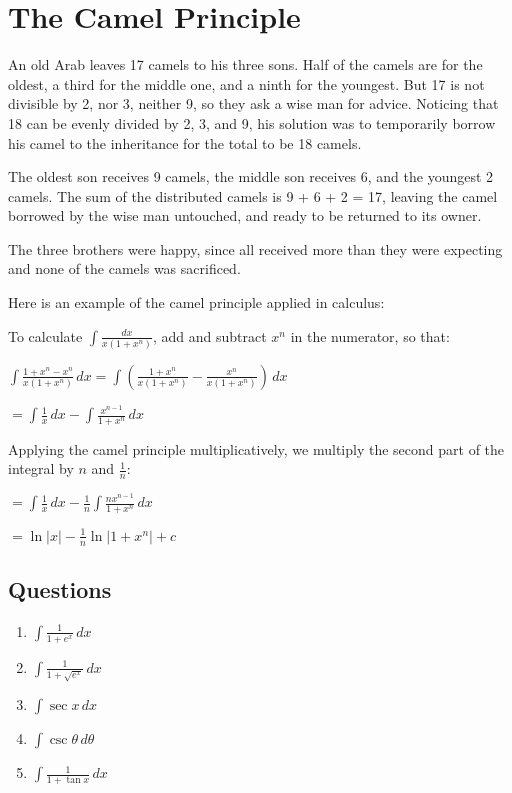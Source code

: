 \documentclass[../main.tex]{subfiles}
\begin{document}
\section{The Camel Principle}
An old Arab leaves 17 camels to his three sons. Half of the camels are for the oldest, a third for the middle one, and a ninth for the youngest. But 17 is not divisible by 2, nor 3, neither 9, so they ask a wise man for advice. Noticing that 18 can be evenly divided by 2, 3, and 9, his solution was to temporarily borrow his camel to the inheritance for the total to be 18 camels.

The oldest son receives 9 camels, the middle son receives 6, and the youngest 2 camels. The sum of the distributed camels is 9 + 6 + 2 = 17, leaving the camel borrowed by the wise man untouched, and ready to be returned to its owner.

The three brothers were happy, since all received more than they were expecting and none of the camels was sacrificed.

Here is an example of the camel principle applied in calculus:

To calculate \(\int \frac{dx}{x(1+x^n)}\), add and subtract \(x^n\) in the numerator, so that:

\(\int \frac{1+x^n-x^n}{x(1+x^n)}\,dx=\int (\frac{1+x^n}{x(1+x^n)}-\frac{x^n}{x(1+x^n)})\,dx\)

\(=\int \frac{1}{x}\,dx-\int \frac{x^{n-1}}{1+x^n}\,dx\)

Applying the camel principle multiplicatively, we multiply the second part of the integral by \(n\) and \(\frac{1}{n}\):

\(=\int \frac{1}{x}\,dx-\frac{1}{n}\int \frac{nx^{n-1}}{1+x^n}\,dx\)

\(=\ln{|x|}-\frac{1}{n}\ln{|1+x^n|}+c\)

\pagebreak

\subsection*{Questions}
\label{Camel Principle}

\begin{enumerate}
    \item \(\int \frac{1}{1+e^x}\,dx\)
    
    \item \(\int \frac{1}{1+\sqrt{e^x}}\,dx\)
    
    \item \(\int \sec{x}\,dx\)
    
    \item \(\int \csc{\theta}\,d\theta\)
    
    \item $\int \frac{1}{1+\tan{x}}\,dx$

\end{enumerate}
\end{document}
